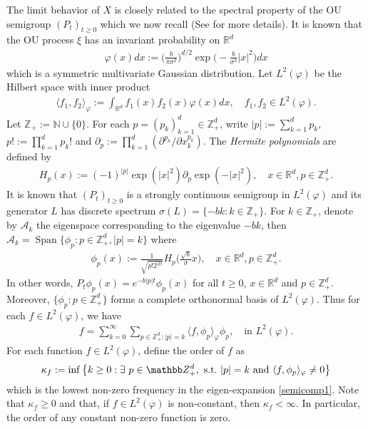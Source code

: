 \documentclass[EJP]{ejpecp} %
\begin{document}
The limit behavior of $X$  is closely related to the spectral property of the OU semigroup $(P_t)_{t\geq 0}$ which we now recall (See \cite{MetafunePallaraPriola2002Spectrum} for more details).
It is known that the OU process $\xi$ has an invariant probability on $\mathbb R^d$
\begin{align}
  \label{invariantdensity}
  \varphi(x)dx
  :=\Big (\frac{b}{\pi \sigma^2}\Big )^{d/2}\exp \Big(-\frac{b}{\sigma^2}|x|^2 \Big)dx
\end{align}
which is a   symmetric multivariate Gaussian distribution.
Let $L^2(\varphi)$ be the Hilbert space with inner product
\begin{align}
  \langle f_1, f_2 \rangle_{\varphi}
  := \int_{\mathbb R^d}f_1(x)f_2(x)\varphi(x) dx, \quad f_1,f_2 \in L^2(\varphi).
\end{align}
Let $\mathbb Z_+ := \mathbb N\cup\{0\}$.
For each $p = (p_k)_{k = 1}^d \in \mathbb{Z}_+^{d}$, write $|p|:=\sum_{k=1}^d p_k$, $p!:= \prod_{k= 1}^d p_k!$ and $\partial_p:= \prod_{k = 1}^d(\partial^{p_k}/\partial x_k^{p_k})$.
The \emph{Hermite polynomials} are defined by
\begin{align}
  H_p(x)
  :=(-1)^{|p|}\exp(|x|^2) \partial_p \exp(-|x|^2)
  , \quad x\in \mathbb R^d, p \in \mathbb{Z}_+^{d}.
\end{align}
It is known that $(P_t)_{t\geq 0}$ is a strongly continuous semigroup in $L^2(\varphi)$ and its generator $L$ has discrete spectrum $\sigma(L)= \{-bk: k \in \mathbb Z_+\}$.
For $k \in \mathbb Z_+$, denote by $\mathcal{A}_k$ the eigenspace corresponding to the eigenvalue $-bk$, then $ \mathcal{A}_k = \operatorname{Span} \{\phi_p : p\in \mathbb Z_+^d, |p|=k\}$ where
\begin{align}
  \label{eigenfunction}
  \phi_p(x)
  := \frac{1}{\sqrt{ p! 2^{|p|} }} H_p \Big(\frac{ \sqrt{b} }{\sigma}x \Big)
  , \quad x\in \mathbb R^d, p\in \mathbb Z_+^d.
\end{align}
In other words,
\(
  P_t\phi_p(x)
  = e^{-b|p|t}\phi_p(x)
\)
for all $t\geq 0$, $x\in \mathbb R^d$ and $p\in \mathbb Z_+^d$.
Moreover, $\{\phi_p: p \in \mathbb Z_+^d\}$ forms a complete orthonormal basis of $L^2(\varphi)$.
Thus for each $f\in L^2(\varphi)$, we have
\begin{align}
  \label{semicomp1}
  f
  = \sum_{k=0}^{\infty}\sum_{p\in \mathbb Z_+^d:|p|=k}\langle f, \phi_p \rangle_{\varphi} \phi_p
  , \quad \text{in~} L^2(\varphi).
\end{align}
For each function $f\in L^2(\varphi)$, define the order of $f$ as
\[
  \kappa_f
  := \inf \left \{k\geq 0: \exists ~ p\in \mathbb Z_+^d , {\rm ~s.t.~} |p|=k {\rm ~and~}  \langle f, \phi_p \rangle_{\varphi}\neq 0\right \}
\]
which is the lowest non-zero frequency in the eigen-expansion \eqref{semicomp1}.
Note that $ \kappa_f\geq 0$ and that, if $f\in L^2(\varphi)$ is non-constant, then $\kappa_f<\infty$.
In particular, the order of any constant non-zero function is zero.
\end{document}
